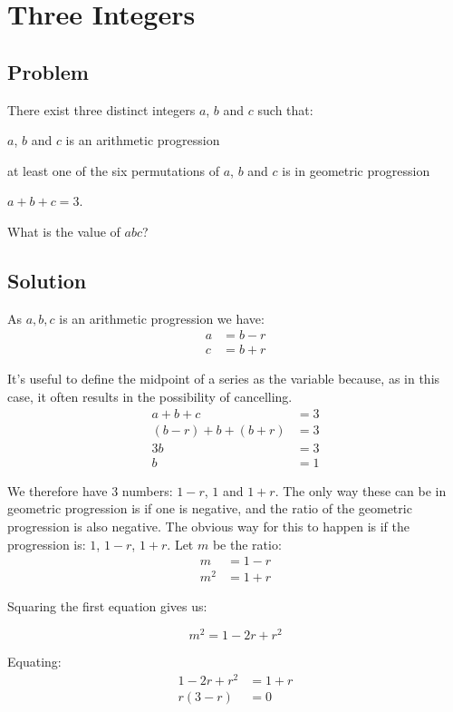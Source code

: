 \documentclass{book}
\begin{document}
\section{Three Integers}
\subsection{Problem}
There exist three distinct integers \(a\), \(b\) and \(c\) such that:

\(a\), \(b\) and \(c\) is an arithmetic progression

at least one of the six permutations of \(a\), \(b\) and \(c\) is in geometric progression

\(a+b+c=3\).

What is the value of \(abc\)?
\subsection{Solution}

As \(a,b,c\) is an arithmetic progression we have:
\begin{align*}
  a&=b-r\\
  c&=b+r
\end{align*}

It's useful to define the midpoint of a series as the variable because, as in this case, it often results in the possibility of cancelling.
\begin{align*}
  a+b+c&=3\\
  (b-r)+b+(b+r)&=3\\
  3b&=3\\
  b&=1
\end{align*}

We therefore have 3 numbers: \(1-r\), \(1\) and \(1+r\). The only way these can be in geometric progression is if one is negative, and the ratio of the geometric progression is also negative. The obvious way for this to happen is if the progression is: \(1\), \(1-r\), \(1+r\).
Let \(m\) be the ratio:
\begin{align*}
  m&=1-r\\
  m^2&=1+r
\end{align*}

Squaring the first equation gives us:

\[m^2=1-2r+r^2\]

Equating:
\begin{align*}
  1-2r+r^2&=1+r\\
  r(3-r)&=0
\end{align*}
\end{document}
